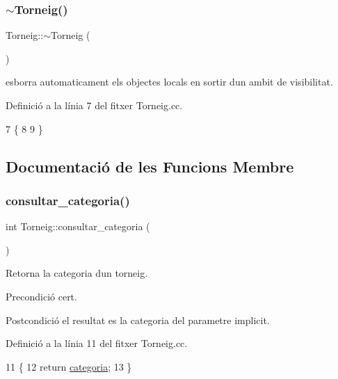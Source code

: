 \subsubsection{\texorpdfstring{$\sim$\+Torneig()}{~Torneig()}}
{\footnotesize\ttfamily Torneig\+::$\sim$\+Torneig (\begin{DoxyParamCaption}{ }\end{DoxyParamCaption})}



esborra automaticament els objectes locals en sortir d\textquotesingle{}un ambit de visibilitat. 



Definició a la línia 7 del fitxer Torneig.\+cc.


\begin{DoxyCode}
7                   \{
8     
9 \}
\end{DoxyCode}


\subsection{Documentació de les Funcions Membre}
\mbox{\label{class_torneig_a78a82b011e01b5d07ade6378da916c3c}} 
\subsubsection{\texorpdfstring{consultar\+\_\+categoria()}{consultar\_categoria()}}
{\footnotesize\ttfamily int Torneig\+::consultar\+\_\+categoria (\begin{DoxyParamCaption}{ }\end{DoxyParamCaption})}



Retorna la categoria d\textquotesingle{}un torneig. 

\begin{DoxyPrecond}{Precondició}
cert. 
\end{DoxyPrecond}
\begin{DoxyPostcond}{Postcondició}
el resultat es la categoria del parametre implicit. 
\end{DoxyPostcond}


Definició a la línia 11 del fitxer Torneig.\+cc.


\begin{DoxyCode}
11                                  \{
12     \textcolor{keywordflow}{return} \mbox{\hyperlink{class_torneig_a8a80ab41ebab7d88a2569247c6ec4c81}{categoria}};
13 \}
\end{DoxyCode}
\mbox{\label{class_torneig_aef12c108d9872a53f8a54f03135c7344}} 
